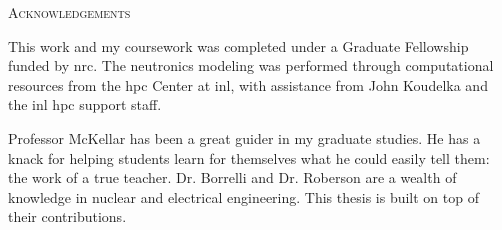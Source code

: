 \begin{center}
   {\LARGE\textsc{Acknowledgements}}

   This work and my coursework was completed under a Graduate Fellowship funded by \acf{nrc}. The neutronics modeling was performed through computational resources from the \acf{hpc} Center at \acf{inl}, with assistance from John Koudelka and the \acs{inl} \acs{hpc} support staff.
   
   Professor McKellar has been a great guider in my graduate studies. He has a knack for helping students learn for themselves what he could easily tell them: the work of a true teacher. Dr. Borrelli and Dr. Roberson are a wealth of knowledge in nuclear and electrical engineering. This thesis is built on top of their contributions.

\end{center}

